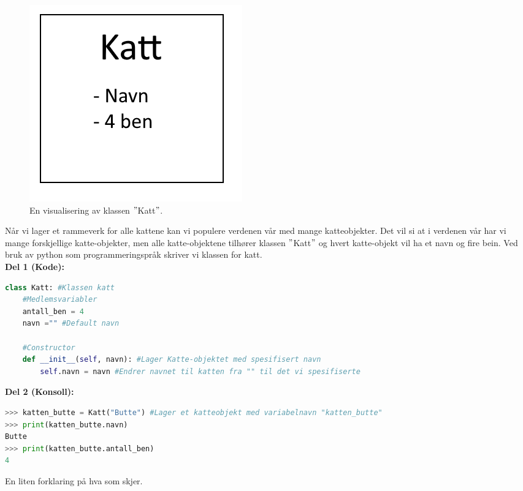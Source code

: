 \begin{figure}[H]
    \centering
    \includegraphics[scale=0.5]{Figures/Klasser_katt.png}
    \caption{En visualisering av klassen $"$Katt$"$.}
    \label{fig:Katte_boks}
\end{figure}

Når vi lager et rammeverk for alle kattene kan vi populere verdenen vår med mange katteobjekter. Det vil si at i verdenen vår har vi mange forskjellige katte-objekter, men alle katte-objektene tilhører klassen $"$Katt$"$ og hvert katte-objekt vil ha et navn og fire bein. Ved bruk av python som programmeringspråk skriver vi klassen for katt.\\[0.5cm]
\textbf{Del 1 (Kode):}
\begin{lstlisting}[language=python]
class Katt: #Klassen katt
    #Medlemsvariabler
    antall_ben = 4 
    navn ="" #Default navn
    
    #Constructor
    def __init__(self, navn): #Lager Katte-objektet med spesifisert navn
        self.navn = navn #Endrer navnet til katten fra "" til det vi spesifiserte

\end{lstlisting}
\textbf{Del 2 (Konsoll):}
\begin{lstlisting}[language=python]
>>> katten_butte = Katt("Butte") #Lager et katteobjekt med variabelnavn "katten_butte"
>>> print(katten_butte.navn) 
Butte
>>> print(katten_butte.antall_ben) 
4
\end{lstlisting}

En liten forklaring på hva som skjer.

